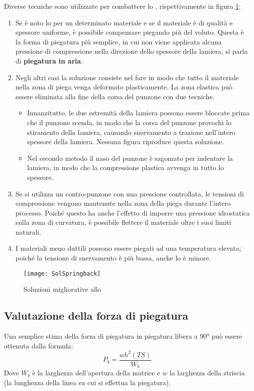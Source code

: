 Diverse tecniche sono utilizzate per combattere lo , rispettivamente in figura \ref{fig:SolSpringback}:
\begin{enumerate}
\item Se è noto lo  per un determinato materiale e se il materiale è di qualità e spessore uniforme, è possibile compensare piegando più del voluto. Questa è la forma di piegatura più semplice, in cui non viene applicata alcuna pressione di compressione nella direzione dello spessore della lamiera, si parla di \textbf{piegatura in aria}.
\item Negli altri casi la soluzione consiste nel fare in modo che tutto il materiale nella zona di piega venga deformato plasticamente. La zona elastica può essere eliminata alla fine della corsa del punzone con due tecniche.
	\begin{itemize}
	\item Innanzitutto, le due estremità della lamiera possono essere bloccate prima che il punzone scenda, in modo che la corsa del punzone provochi lo stiramento della lamiera, causando snervamento a trazione nell'intero spessore della lamiera. Nessuna figura riproduce questa soluzione.
	\item Nel secondo metodo il naso del punzone è sagomato per indentare la lamiera, in modo che la compressione plastica avvenga in tutto lo spessore.
	\end{itemize}
\item Se si utilizza un contro-punzone con una pressione controllata, le tensioni di compressione vengono mantenute nella zona della piega durante l'intero processo. Poiché questo ha anche l'effetto di imporre una pressione idrostatica sulla zona di curvatura, è possibile flettere il materiale oltre i suoi limiti naturali.
\item I materiali meno duttili possono essere piegati ad una temperatura elevata; poiché la tensione di snervamento è più bassa, anche lo  è minore.
\end{enumerate}

\begin{figure}
\centering
\texttt{[image: SolSpringback]}
\caption{Soluzioni migliorative allo }
\label{fig:SolSpringback}
\end{figure}

\subsection{Valutazione della forza di piegatura}
Una semplice stima della forza di piegatura in piegatura libera a $90\unit{\degree}$ può essere ottenuta dalla formula:
\begin{equation}
P_b = \frac{wh^2 (TS)}{W_b}
\end{equation}
Dove $W_b$ è la larghezza dell'apertura della matrice e $w$ la larghezza della striscia (la lunghezza della linea su cui si effettua la piegatura).

